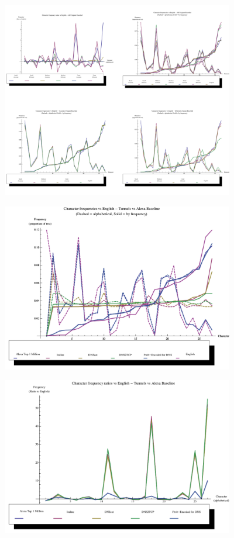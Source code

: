 \documentclass[12pt]{report}
\theoremstyle{remark}
\theoremstyle{definition}
\theoremstyle{definition}
\theoremstyle{definition}
\begin{document}
\begin{figure}
\centering
\includegraphics[width=4in]{figures/plots_unigram.pdf}
\end{figure}
\begin{figure}
\centering
\includegraphics[width=4in]{figures/tunnels-freqabs.pdf}
\end{figure}
\begin{figure}
\centering
\includegraphics[width=4in]{figures/tunnels-freqrel.pdf}
\end{figure}
\clearpage
\end{document}
